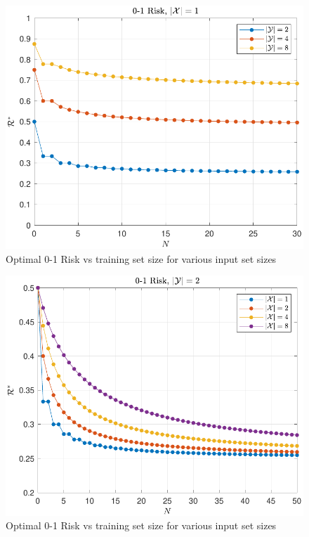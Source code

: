 \documentclass[conference]{IEEEtran}
\begin{document}
\begin{figure}
\centering
\includegraphics[width=1.0\linewidth]{Risk_01_uni_N_leg_My.pdf}
\caption{Optimal 0-1 Risk vs training set size for various input set sizes}
\label{fig:Risk_01_uni_N_leg_My}
\end{figure}

\begin{figure}
\centering
\includegraphics[width=1.0\linewidth]{Risk_01_uni_N_leg_Mx.pdf}
\caption{Optimal 0-1 Risk vs training set size for various input set sizes}
\label{fig:Risk_01_uni_N_leg_Mx}
\end{figure}
\end{document}
